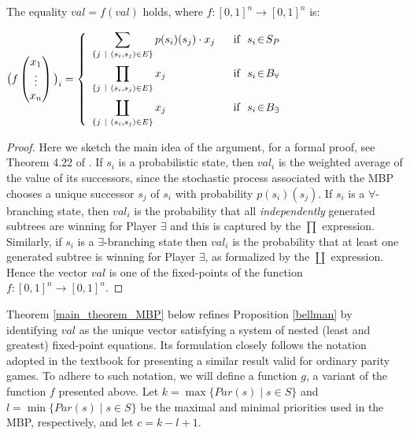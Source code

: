 \begin{proposition}\label{bellman}
  The equality $val \!=\! f(val)$ holds, where  $f\!:\![0,1]^n \!\rightarrow\! [0,1]^n$ is:
\begin{center}
$
\big(f\begin{pmatrix} 
x_1\\ 
\vdots\\
x_n
\end{pmatrix}\big)_i = \left\{\begin{array}{l  l}      
								\displaystyle 	\sum_{\{ j \ \mid \ (s_i,s_j)\in E\}} p(s_i)(s_j) \cdot x_j \ \ & \textnormal{if }\ s_i\!\in\! S_{P} \vspace{5pt} \\
								\displaystyle \prod_{\{ j\  \mid \ (s_i,s_j)\in E\}} x_j & \textnormal{if } \  s_i\!\in\! B_{\forall} \vspace{5pt} \\
								\displaystyle \coprod_{\{ j\  \mid\  (s_i,s_j)\in E\}} x_j & \textnormal{if } \  s_i\!\in\! B_{\exists}
                      	      \end{array}      \right.
$
\end{center}
\end{proposition}

\begin{proof} 
Here we sketch the main idea of the argument, for a formal proof, see Theorem 4.22 of \cite{MIO2012b}.
If $s_i$ is a probabilistic state, then $val_i$ is the weighted average of the value of its successors, since the stochastic process associated with the MBP chooses a unique successor $s_j$ of $s_i$ with probability $p(s_i)(s_j)$.  If $s_i$ is a $\forall$-branching state, then $val_i$ is the probability that all \emph{independently} generated subtrees are winning for Player $\exists$ and this is captured by the $\prod$ expression. Similarly, if $s_i$ is a $\exists$-branching state then $val_i$ is the probability that at least one generated subtree is winning for Player $\exists$, as formalized by the $\coprod$ expression.
Hence the vector $val$ is one of the fixed-points of the function $f\!:\![0,1]^n \!\rightarrow\! [0,1]^n$.
\end{proof}
Theorem \ref{main_theorem_MBP} below refines Proposition \ref{bellman} by identifying $val$ as the unique vector satisfying a system of nested (least and greatest) fixed-point equations. Its formulation closely follows the notation adopted in the textbook \cite[\S 4.3]{Rudiments2001} for presenting a similar result valid for ordinary parity games. To adhere to such notation, we will define a function $g$, a variant of the function $f$ presented above. Let $k\!=\!\max\{ Par(s) \mid s\!\in\! S\}$ and $l \!=\!\min\{ Par(s) \mid s\!\in\! S\}$  be the maximal and minimal priorities used in the MBP, respectively, and let $c\!=\!k-l+1$. 


